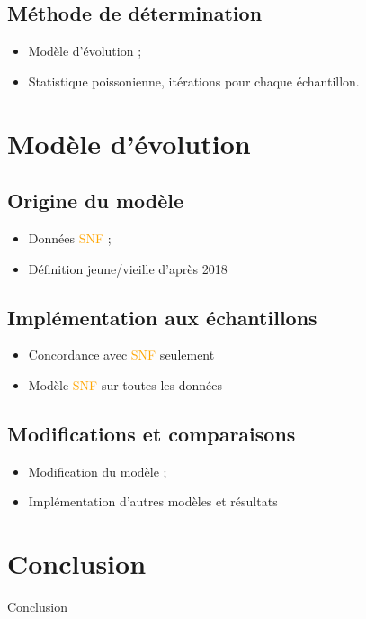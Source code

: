 \documentclass[a4paper, 12pt, svgnames]{article}
\begin{document}
\subsection{Méthode de détermination}
\begin{itemize}
    \item Modèle d'évolution ;
    \item Statistique poissonienne, itérations pour chaque échantillon.
\end{itemize}

\section{Modèle d'évolution}
\subsection{Origine du modèle}
\begin{itemize}
    \item Données \textcolor{orange}{SNF} ;
    \item Définition jeune/vieille d'après  2018
\end{itemize}

\subsection{Implémentation aux échantillons}
\begin{itemize}
    \item Concordance avec \textcolor{orange}{SNF} seulement
    \item Modèle \textcolor{orange}{SNF} sur toutes les données
\end{itemize}

\subsection{Modifications et comparaisons}
\begin{itemize}
    \item Modification du modèle ;
    \item Implémentation d'autres modèles et résultats
\end{itemize}

\section{Conclusion}
Conclusion



\end{document}

